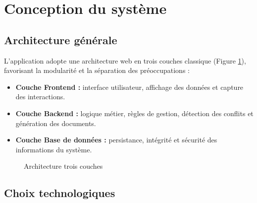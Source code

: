 \documentclass[12pt,a4paper]{article}
\begin{document}
\section{Conception du système}
\label{sec:conception}

\subsection{Architecture générale}
\label{subsec:architecture}

L'application adopte une architecture web en trois couches classique
(Figure \ref{fig:architecture}), favorisant la modularité et la séparation des
préoccupations :

\begin{itemize}[label=\textcolor{primary}{\textbullet}]
    \item \textbf{Couche Frontend :} interface utilisateur, affichage des données
          et capture des interactions.
    \item \textbf{Couche Backend :} logique métier, règles de gestion, détection
          des conflits et génération des documents.
    \item \textbf{Couche Base de données :} persistance, intégrité et sécurité
          des informations du système.
\end{itemize}

\begin{figure}[H]
    \centering
    \caption{Architecture trois couches}
    \label{fig:architecture}
\end{figure}

\subsection{Choix technologiques}
\label{subsec:stack}
\end{document}
